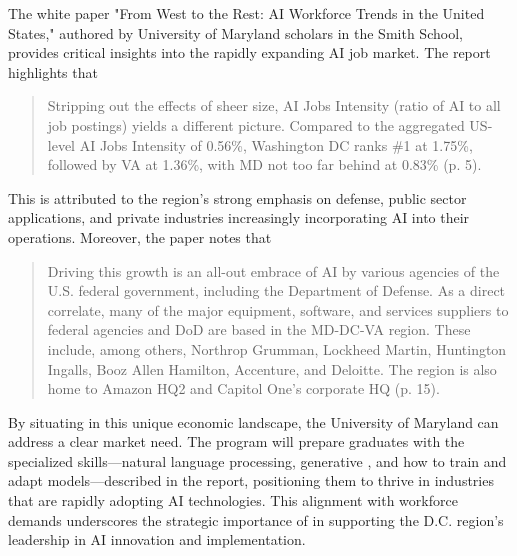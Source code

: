 The white paper "From West to the Rest: AI Workforce Trends in the United States," authored by University of Maryland scholars in the Smith School, provides critical insights into the rapidly expanding AI job market. The report highlights that
\begin{quote}
Stripping out the effects of sheer size, AI Jobs Intensity (ratio of AI to all job postings) yields a different picture. Compared to the aggregated US-level AI Jobs Intensity of 0.56\%, Washington DC ranks \#1 at 1.75\%, followed by VA at 1.36\%, with MD not too far behind at 0.83\% (p. 5).
\end{quote}
This is attributed to the region's strong emphasis on defense, public sector applications, and private industries increasingly incorporating AI into their operations. Moreover, the paper notes that 
\begin{quote}
Driving this growth is an all-out embrace of AI by various agencies of the U.S. federal government, including the Department of Defense. As a direct correlate, many of the major equipment, software, and services suppliers to federal agencies and DoD are based in the MD-DC-VA region. These include, among others, Northrop Grumman, Lockheed Martin, Huntington Ingalls, Booz Allen Hamilton, Accenture, and Deloitte. The region is also home to Amazon HQ2 and Capitol One’s corporate HQ (p. 15).\end{quote}
By situating \short{} in this unique economic landscape, the University of Maryland can address a clear market need. The program will prepare graduates with the specialized skills---natural language processing, generative \ai{}, and how to train and adapt models---described in the report, positioning them to thrive in industries that are rapidly adopting AI technologies. This alignment with workforce demands underscores the strategic importance of \short{} in supporting the D.C. region's leadership in AI innovation and implementation.



